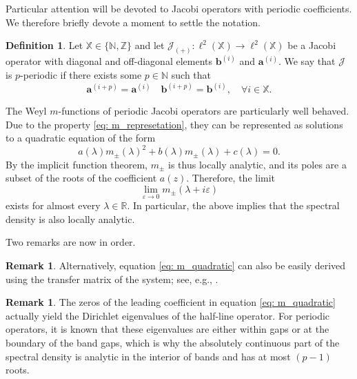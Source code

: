 \documentclass[a4paper,reqno,twoside]{amsart}
\numberwithin{equation}{section}
\theoremstyle{definition}
\newtheorem{definition}[theorem]{Definition}
\newtheorem{remark}[theorem]{Remark}
\newcommand{\bseq}[2]{{\bm{#1}^{(#2)}}}
\newcommand{\<}{\ensuremath \leq}
\renewcommand{\>}{\ensuremath \geq}
\renewcommand{\epsilon}{\varepsilon}
\begin{document}
Particular attention will be devoted to Jacobi operators with periodic coefficients. We therefore briefly devote a moment to settle the notation.

\begin{definition}
    Let $\mathbb{X} \in \{\mathbb{N}, \mathbb{Z}\}$ and let $\mathcal{J}_{(+)}:\ell^2(\mathbb{X})\rightarrow\ell^2(\mathbb{X})$ be a Jacobi operator with diagonal and off-diagonal elements $\bseq{b}{i}$ and $\bseq{a}{i}$. We say that $\mathcal{J}$ is $p$-periodic if there exists some $p\in\mathbb{N}$ such that
    \begin{equation}
        \bseq{a}{i+p} = \bseq{a}{i} \quad \bseq{b}{i+p} = \bseq{b}{i},  \quad\forall i\in \mathbb{X.}
    \end{equation}
\end{definition}

The Weyl $m$-functions of periodic Jacobi operators are particularly well behaved. Due to the property \eqref{eq: m_represetation}, they can be represented as solutions to a quadratic equation of the form
\begin{equation}\label{eq: m_quadratic}
    a(\lambda) m_\pm(\lambda)^2 + b(\lambda)m_\pm(\lambda) + c(\lambda) = 0.
\end{equation}
By the implicit function theorem, $m_\pm$ is thus locally analytic, and its poles are a subset of the roots of the coefficient $a(z)$. Therefore, the limit
\begin{equation}
    \lim_{\epsilon\rightarrow0} m_\pm(\lambda + i\epsilon)
\end{equation}
exists for almost every $\lambda \in \mathbb{R}$. In particular, the above implies that the spectral density is also locally analytic. 

Two remarks are now in order.
\begin{remark}
    Alternatively, equation \eqref{eq: m_quadratic} can also be easily derived using the transfer matrix of the system; see, e.g., \cite{damanik.fillman2022OneDimensional}.
\end{remark}
\begin{remark}
    The zeros of the leading coefficient in equation \eqref{eq: m_quadratic} actually yield the Dirichlet eigenvalues of the half-line operator. For periodic operators, it is known that these eigenvalues are either within gaps or at the boundary of the band gaps, which is why the absolutely continuous part of the spectral density is analytic in the interior of bands and has at most $(p-1)$ roots.
\end{remark}
\end{document}
